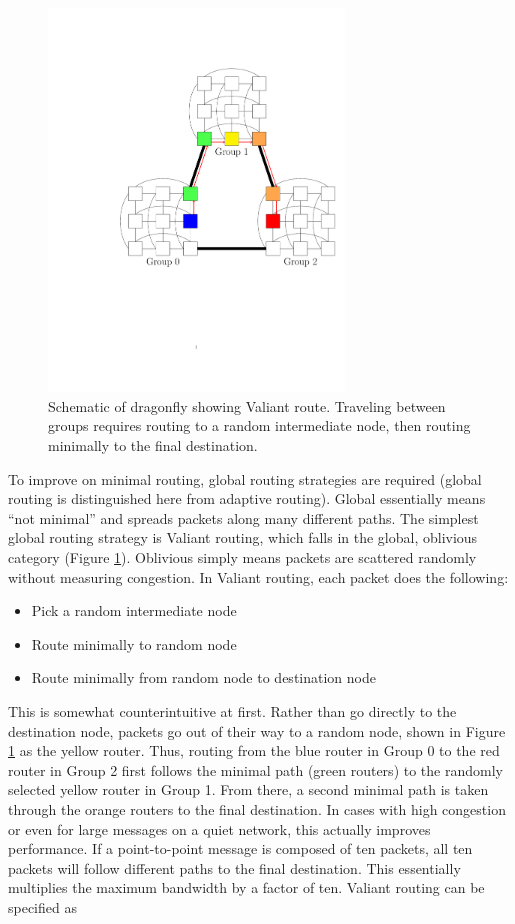 \begin{figure}[h!]
\centering
\includegraphics[width=0.7\textwidth]{figures/tikz/dragonfly/dflyvaliant.pdf}
\caption{Schematic of dragonfly showing Valiant route. Traveling between groups requires routing to a random intermediate node, then routing minimally to the final destination.}
\label{fig:topologies:dflyvaliantroute}
\end{figure}

To improve on minimal routing, global routing strategies are required (global routing is distinguished here from adaptive routing).  
Global essentially means ``not minimal'' and spreads packets along many different paths.
The simplest global routing strategy is Valiant routing, which falls in the global, oblivious category (Figure \ref{fig:topologies:dflyvaliantroute}).
Oblivious simply means packets are scattered randomly without measuring congestion.
In Valiant routing, each packet does the following:
\begin{itemize}
\item Pick a random intermediate node 
\item Route minimally to random node
\item Route minimally from random node to destination node
\end{itemize}
This is somewhat counterintuitive at first.
Rather than go directly to the destination node, packets go out of their way to a random node, shown in Figure \ref{fig:topologies:dflyvaliantroute} as the yellow router.
Thus, routing from the blue router in Group 0 to the red router in Group 2 first follows the minimal path (green routers) to the randomly selected yellow router in Group 1. 
From there, a second minimal path is taken through the orange routers to the final destination.
In cases with high congestion or even for large messages on a quiet network, this actually improves performance.
If a point-to-point message is composed of ten packets,
all ten packets will follow different paths to the final destination.
This essentially multiplies the maximum bandwidth by a factor of ten.
Valiant routing can be specified as

